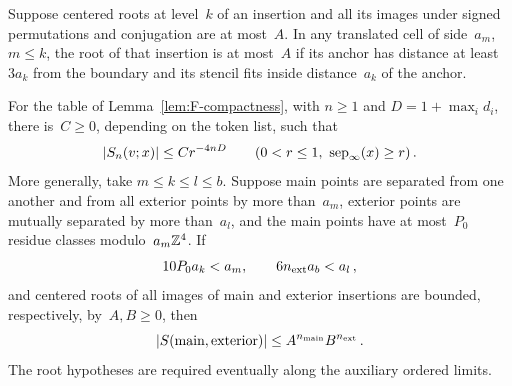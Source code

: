 \begin{lemma}\label{lem:F-cells}
Suppose centered roots at level~$k$ of an insertion and all its images under signed permutations and conjugation are at most~$A$. In any translated cell of side~$a_m$, $m\le k$, the root of that insertion is at most~$A$ if its anchor has distance at least~$3a_k$ from the boundary and its stencil fits inside distance~$a_k$ of the anchor.

For the table of Lemma~\ref{lem:F-compactness}, with $n\ge1$ and $D=1+\max_i d_i$, there is~$C\ge0$, depending on the token list, such that
\begin{equation}\label{eq:F-power}
|S_n(v;x)|\le Cr^{-4nD}\qquad(0<r\le1,\ \operatorname{sep}_{\infty}(x)\ge r)\,.
\end{equation}
More generally, take $m\le k\le l\le b$. Suppose main points are separated from one another and from all exterior points by more than~$a_m$, exterior points are mutually separated by more than~$a_l$, and the main points have at most~$P_0$ residue classes modulo~$a_m\mathbb{Z}^4$. If
\begin{equation}\label{eq:F-margins}
10P_0a_k<a_m,\qquad 6n_{\rm ext}a_b<a_l\,,
\end{equation}
and centered roots of all images of main and exterior insertions are bounded, respectively, by~$A,B\ge0$, then
\begin{equation}\label{eq:F-two-cells}
|S(\text{main},\text{exterior})|\le A^{n_{\rm main}}B^{n_{\rm ext}}\,.
\end{equation}
The root hypotheses are required eventually along the auxiliary ordered limits.
\end{lemma}

